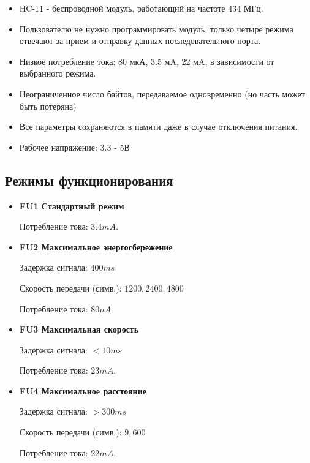 \documentclass[bibliography=totocnumbered]{scrartcl}
\begin{document}
\begin{itemize}

\item HC-11 - беспроводной модуль, работающий на частоте 434 МГц.

\item Пользователю не нужно программировать модуль, только четыре режима отвечают за прием и отправку данных последовательного порта.

\item Низкое потребление тока: 80 мкА, 3.5 мA, 22 мA, в зависимости от выбранного режима.

\item Неограниченное число байтов, передаваемое одновременно (но часть может быть потеряна)


\item Все параметры сохраняются в памяти даже в случае отключения питания.


\item Рабочее напряжение: 3.3 - 5В

\end{itemize}

\subsection{Режимы функционирования}

\begin{itemize}

\item \textbf{FU1 Стандартный режим }
   
Потребление тока: $3.4mA$.

\item \textbf{FU2 Максимальное энергосбережение}

Задержка сигнала: $400ms$
  
Скорость передачи (симв.): $1200, 2400, 4800$
 
Потребление тока: $80\mu A$

\item \textbf{FU3 Максимальная скорость}

Задержка сигнала: $< 10 ms$ 

Потребление тока: $23 mA$.

\item \textbf{FU4 Максимальное расстояние}

Задержка сигнала: $>300ms$ 

Скорость передачи (симв.): $9,600$ 

Потребление тока: $22mA$.

\end{itemize}
\end{document}
